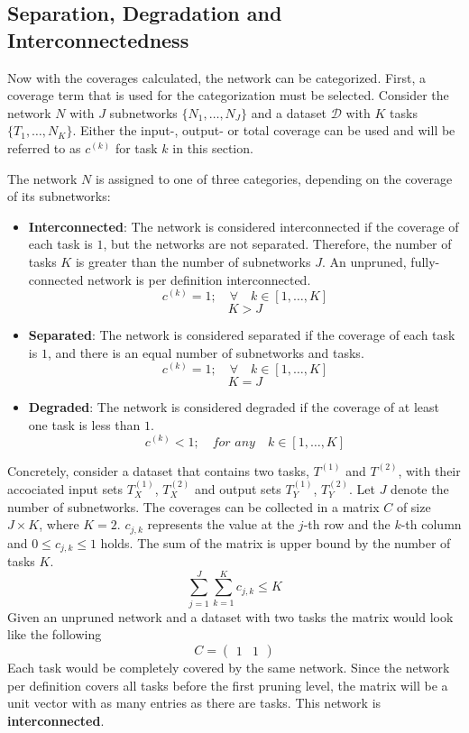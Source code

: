 \subsection{Separation, Degradation and Interconnectedness}
Now with the coverages calculated, the network can be categorized.
First, a coverage term that is used for the categorization must be selected.
Consider the network $N$ with $J$ subnetworks $\{N_1, \dots, N_J\}$ and a dataset $\mathcal{D}$ with $K$ tasks $\{T_1, \dots, N_K\}$.
Either the input-, output- or total coverage can be used and will be referred to as $c^{(k)}$ for task $k$ in this section.

The network $N$ is assigned to one of three categories, depending on the coverage of its subnetworks:
\begin{itemize}
    \item \textbf{Interconnected}: The network is considered interconnected if the coverage of each task is $1$, but the networks are not separated. Therefore, the number of tasks $K$ is greater than the number of subnetworks $J$.
    An unpruned, fully-connected network is per definition interconnected.
    \[ c^{(k)} = 1; \quad\forall\quad k \in [1, \dots, K]\]
    \[ K > J \]

    \item \textbf{Separated}: The network is considered separated if the coverage of each task is $1$, and there is an equal number of subnetworks and tasks.
    \[ c^{(k)} = 1; \quad\forall\quad k \in [1, \dots, K]\]
    \[ K = J \]

    \item \textbf{Degraded}: The network is considered degraded if the coverage of at least one task is less than $1$.
    \[ c^{(k)} < 1; \quad\textit{for any}\quad k \in [1, \dots, K]\]
\end{itemize}

Concretely, consider a dataset that contains two tasks, $T^{(1)}$ and $T^{(2)}$, with their accociated input sets $T^{(1)}_X$, $T^{(2)}_X$ and output sets $T^{(1)}_Y$, $T^{(2)}_Y$.
Let $J$ denote the number of subnetworks.
The coverages can be collected in a matrix $C$ of size $J \times K$, where $K=2$. 
$c_{j,k}$ represents the value at the $j$-th row and the $k$-th column and $0 \leq c_{j,k} \leq 1$ holds.
The sum of the matrix is upper bound by the number of tasks $K$.
\[ \sum_{j=1}^{J} \sum_{k=1}^{K} c_{j,k} \leq K \]
Given an unpruned network and a dataset with two tasks the matrix would look like the following 
\[ C = \begin{pmatrix} 1 & 1 \end{pmatrix} \]
Each task would be completely covered by the same network.
Since the network per definition covers all tasks before the first pruning level, the matrix will be a unit vector with as many entries as there are tasks.
This network is \textbf{interconnected}.

